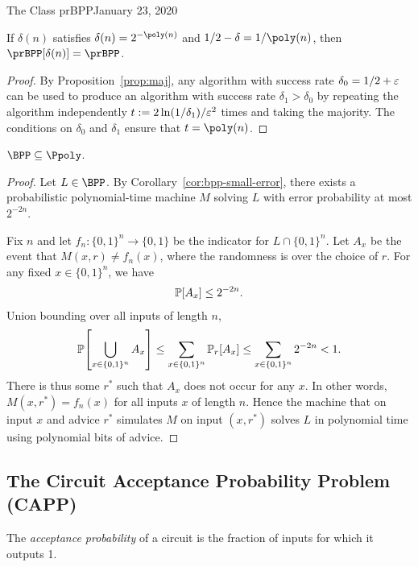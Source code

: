 \begin{lecture}{1}{The Class prBPP}{January 23, 2020}
\begin{corollary}\label{cor:bpp-small-error}
  If $\delta(n)$ satisfies $\delta(n) = 2^{-\poly(n)}$ and $1/2 - \delta =
  1/\poly(n)$, then $\prBPP[\delta(n)] = \prBPP$.
\end{corollary}

\begin{proof}
  By Proposition~\ref{prop:maj}, any algorithm with success rate $\delta_0 =
  1/2 + \varepsilon$ can be used to produce an algorithm with success rate $\delta_1 >
  \delta_0$ by repeating the algorithm independently $t :=
  2\ln(1/\delta_1)/\varepsilon^2$ times and taking the majority. The conditions on
  $\delta_0$ and $\delta_1$ ensure that $t = \poly(n)$.
\end{proof}

\begin{corollary}
  $\BPP \subseteq \Ppoly$.
\end{corollary}

\begin{proof}
    Let $L \in \BPP$. By Corollary~\ref{cor:bpp-small-error}, there exists a
    probabilistic polynomial-time machine $M$ solving $L$ with error
    probability at most $2^{-2n}$.

    Fix $n$ and let $f_n : \{0, 1\}^n \to \{0, 1\}$ be the indicator for $L
    \cap \{0, 1\}^n$. Let $A_x$ be the event that $M(x, r) \ne f_n(x)$, where
    the randomness is over the choice of $r$. For any fixed $x \in \{0, 1\}^n$,
    we have
    \begin{align*}
      \Pr\brac*{A_x} \leq 2^{-2n}.
    \end{align*}
    Union bounding over all inputs of length $n$, \[
      \Pr\brac*{\bigcup_{x \in \set{0, 1}^n} A_x}
      \leq \sum_{x \in \set{0,1}^n} \Pr_r\brac*{A_x}
      \leq \sum_{x \in \set{0,1}^n} 2^{-2n}
      < 1.
    \]
    There is thus some $r^*$ such that $A_x$ does not occur for any $x$. In
    other words, $M(x,r^*) = f_n(x)$ for all inputs $x$ of length $n$. Hence the
    machine that on input $x$ and advice $r^*$ simulates $M$ on input $(x,
    r^*)$ solves $L$ in polynomial time using polynomial bits of advice.
\end{proof}


\subsection{The Circuit Acceptance Probability Problem (CAPP)}

The \emph{acceptance probability} of a circuit is the fraction of inputs for
which it outputs 1.


\end{lecture}
